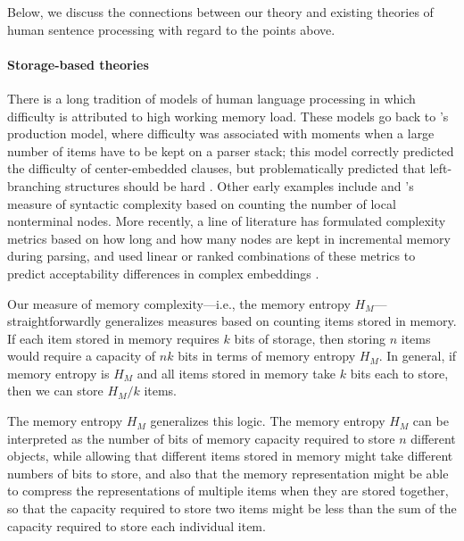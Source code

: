 Below, we discuss the connections between our theory and existing theories of human sentence processing with regard to the points above.

\paragraph{Storage-based theories}

There is a long tradition of models of human language processing in which difficulty is attributed to high working memory load. 
These models go back to \citet{yngve1960model}'s production model, where difficulty was associated with moments when a large number of items have to be kept on a parser stack; this model correctly predicted the difficulty of center-embedded clauses, but problematically predicted that left-branching structures should be hard \citep{kimball1973seven}. Other early examples include \citet{miller-finitary-1963} and \citet{frazier1985syntactic}'s measure of syntactic complexity based on counting the number of local nonterminal nodes. More recently, a line of literature has formulated complexity metrics based on how long and how many nodes are kept in incremental memory during parsing, and used linear or ranked combinations of these metrics to predict acceptability differences in complex embeddings \citep{kobele2013memory,graf2014evaluating,rambow201512,GrafEtAl15MOL,gerth2015memory,GrafEtAl17JLM,desanto2020parsing}.


Our measure of memory complexity---i.e., the memory entropy $H_M$---straightforwardly generalizes measures based on counting items stored in memory. If each item stored in memory requires $k$ bits of storage, then storing $n$ items would require a capacity of $nk$ bits in terms of memory entropy $H_M$. In general, if memory entropy is $H_M$ and all items stored in memory take $k$ bits each to store, then we can store $H_M/k$ items. 

The memory entropy $H_M$ generalizes this logic. The memory entropy $H_M$ can be interpreted as the number of bits of memory capacity required to store $n$ different objects, while allowing that different items stored in memory might take different numbers of bits to store, and also that the memory representation might be able to compress the representations of multiple items when they are stored together, so that the capacity required to store two items might be less than the sum of the capacity required to store each individual item. 

